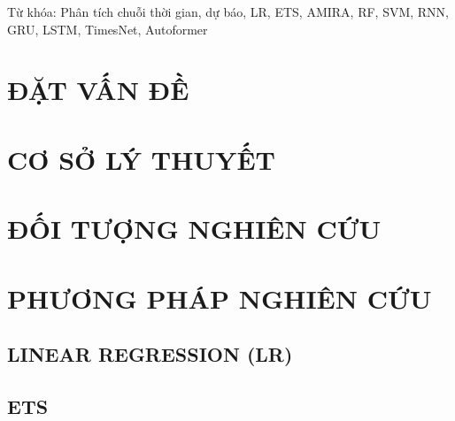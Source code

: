 \documentclass[conference]{IEEEtran}
\begin{document}
\maketitle
\thispagestyle{fancy}
\begin{abstract}

\end{abstract}

Từ khóa: Phân tích chuỗi thời gian, dự báo, LR, ETS, AMIRA, RF, SVM, RNN, GRU, LSTM, TimesNet, Autoformer

\section{ĐẶT VẤN ĐỀ}


\section{CƠ SỞ LÝ THUYẾT}




















\section{ĐỐI TƯỢNG NGHIÊN CỨU}


\section{PHƯƠNG PHÁP NGHIÊN CỨU}
\subsection{LINEAR REGRESSION (LR)}


\subsection{ETS}

\end{document}
